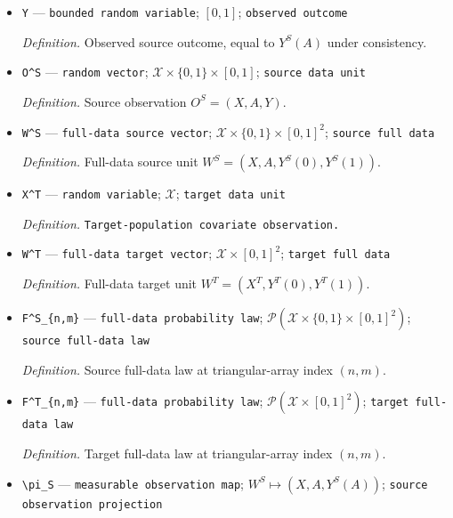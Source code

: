 \documentclass{article}
\begin{document}
\begin{itemize}
  \par\smallskip\noindent\emph{Definition.} Target-population potential outcome under treatment \(d\).
  \item \texttt{Y} --- \texttt{bounded random variable}; \([0,1]\); \texttt{observed outcome}
  \par\smallskip\noindent\emph{Definition.} Observed source outcome, equal to \(Y^S(A)\) under consistency.
  \item \texttt{O\textasciicircum{}S} --- \texttt{random vector}; \(\mathcal X\times\{0,1\}\times[0,1]\); \texttt{source data unit}
  \par\smallskip\noindent\emph{Definition.} Source observation \(O^S=(X,A,Y)\).
  \item \texttt{W\textasciicircum{}S} --- \texttt{full-\allowbreak{}data source vector}; \(\mathcal X\times\{0,1\}\times[0,1]^2\); \texttt{source full data}
  \par\smallskip\noindent\emph{Definition.} Full-data source unit \(W^S=(X,A,Y^S(0),Y^S(1))\).
  \item \texttt{X\textasciicircum{}T} --- \texttt{random variable}; \(\mathcal X\); \texttt{target data unit}
  \par\smallskip\noindent\emph{Definition.} \texttt{Target-\allowbreak{}population covariate observation.}
  \item \texttt{W\textasciicircum{}T} --- \texttt{full-\allowbreak{}data target vector}; \(\mathcal X\times[0,1]^2\); \texttt{target full data}
  \par\smallskip\noindent\emph{Definition.} Full-data target unit \(W^T=(X^T,Y^T(0),Y^T(1))\).
  \item \texttt{F\textasciicircum{}S\_\allowbreak{}\{n,\allowbreak{}m\}\allowbreak{}} --- \texttt{full-\allowbreak{}data probability law}; \(\mathcal P(\mathcal X\times\{0,1\}\times[0,1]^2)\); \texttt{source full-\allowbreak{}data law}
  \par\smallskip\noindent\emph{Definition.} Source full-data law at triangular-array index \((n,m)\).
  \item \texttt{F\textasciicircum{}T\_\allowbreak{}\{n,\allowbreak{}m\}\allowbreak{}} --- \texttt{full-\allowbreak{}data probability law}; \(\mathcal P(\mathcal X\times[0,1]^2)\); \texttt{target full-\allowbreak{}data law}
  \par\smallskip\noindent\emph{Definition.} Target full-data law at triangular-array index \((n,m)\).
  \item \texttt{\textbackslash{}\allowbreak{}pi\_\allowbreak{}S} --- \texttt{measurable observation map}; \(W^S\mapsto(X,A,Y^S(A))\); \texttt{source observation projection}

\end{itemize}
\end{document}
